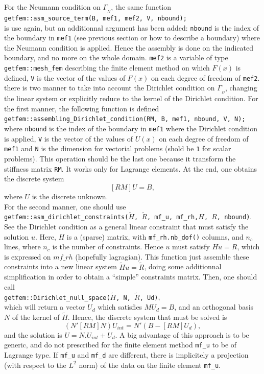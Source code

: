 \documentclass[11pt,a4paper]{article}
\begin{document}
For the Neumann condition on $\Gamma_{_N}$, the same function\\[0.5cm]
{\tt getfem::asm\_source\_term(B, mef1, mef2, V, nbound);} \\[0.5cm]
is use again, but an additionnal argument has been added: {\tt nbound} is the index of the boundary in {\tt mef1} (see previous section or how to describe a boundary) where the Neumann condition is applied. Hence the assembly is done on the indicated boundary, and no more on the whole domain. {\tt mef2}  is a variable of type {\tt getfem::mesh\_fem} describing the finite element method on which $F(x)$ is defined, {\tt V} is the vector of the values of $F(x)$ on each degree of freedom of {\tt mef2}.\\[0.5cm]
there is two manner to take into account the Dirichlet condition on $\Gamma_{_D}$, changing the linear system or explicitly reduce to the kernel of the Dirichlet condition. For the first manner, the following function is defined \\[0.5cm]
{\tt getfem::assembling\_Dirichlet\_condition(RM, B, mef1, nbound, V, N);} \\[0.5cm]
where {\tt nbound} is the index of the boundary in {\tt mef1} where the Dirichlet condition is applied, {\tt V} is the vector of the values of $U(x)$ on each degree of freedom of {\tt mef1} and {\tt N} is the dimension for vectorial problems (shold be {\tt 1} for scalar problems). This operation should be the last one because it transform the stiffness matrix {\tt RM}. It works only for Lagrange elements. At the end, one obtains the discrete system
$$ [RM] U = B, $$
where $U$ is the discrete unknown.\\[0.5cm]

For the second manner, one should use\\[0.5cm]
{\tt getfem::asm\_dirichlet\_constraints($\tilde{H}$, $\tilde{R}$, mf\_u, mf\_rh,$H$, $R$, nbound)}.\\[0.5cm]
See the Dirichlet condition as a general linear constraint that must satisfy the solution $u$. Here, $H$ is a (sparse) matrix, with {\tt mf\_rh.nb\_dof()} columns, and $n_c$ lines, where $n_c$ is the number of constraints. Hence $u$ must satisfy $Hu=R$, which is expressed on $mf\_rh$ (hopefully lagragian). This function just assemble these constraints into a new linear system $\tilde{H}u=\tilde{R}$, doing some additionnal simplification in order to obtain a ``simple'' constraints matrix.
Then, one should call \\[0.5cm]{\tt getfem::Dirichlet\_null_space($\tilde{H}$, N, $\tilde{R}$, Ud)},\\[0.5cm] which will return a vector $U_d$ which satisfies $MU_d=B$, and an orthogonal basis $N$ of the kernel of $\tilde{H}$. Hence, the discrete system that must be solved is 
$$ (N'[RM]N) U_{int}=N'(B-[RM]U_d),$$
and the solution is $U=N.U_{int}+U_d$.
A big advantage of this approach is to be generic, and do not prescribed for the finite element method {\tt mf\_u} to be of Lagrange type. If {\tt mf\_u} and 
{\tt mf\_d} are different, there is implicitely a projection (with respect to the $L^2$ norm) of the data on the finite element {\tt mf\_u}.
\end{document}
